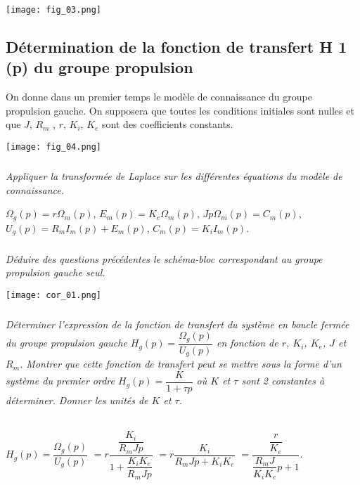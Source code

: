 \begin{multicols}{2}
\begin{center}
\texttt{[image: fig\_03.png]}
\end{center}
\fi


\subsection*{Détermination de la fonction de transfert H 1 (p) du groupe propulsion}
\ifprof
\else
On donne dans un premier temps le modèle de connaissance du groupe propulsion gauche. On supposera que toutes les conditions initiales sont nulles et que  $J$,  $R_m$ , $r$, $K_i$, $K_e$ sont des coefficients constants.

\begin{center}
\texttt{[image: fig\_04.png]}
\end{center}
\fi

\subparagraph{}
\textit{Appliquer la transformée de Laplace sur les différentes équations du modèle de connaissance.}
\ifprof
\begin{corrige}
$\Omega_g(p)=r\Omega_m(p)$, 
$E_m(p)=K_e\Omega_m(p)$, 
$Jp\Omega_m(p)=C_m(p)$,
$U_g(p)=R_m I_m(p) + E_m(p)$,
$C_m(p)=K_i I_m(p)$. 
\end{corrige}
\else
\fi


\subparagraph{}
\textit{Déduire des questions précédentes le schéma-bloc correspondant au groupe propulsion gauche seul. }
\ifprof
\begin{corrige}
\begin{center}
\texttt{[image: cor\_01.png]}
\end{center}
\end{corrige}
\else
\fi

\subparagraph{}
\textit{Déterminer l’expression de la fonction de transfert du système en boucle fermée du groupe propulsion gauche 
$H_g (p) =\dfrac{\Omega_g(p)}{U_g(p)}$ en fonction de $r$, $K_i$, $K_e$, $J$ et $R_m$. Montrer que cette fonction de
transfert peut se mettre sous la forme d’un système du premier ordre $H_g(p)=\dfrac{K}{1+\tau p}$  où $K$ et $\tau$ 
sont 2 constantes à déterminer. Donner les unités de $K$ et $\tau$. } 

\ifprof
\begin{corrige} ~\\

$H_g (p) =\dfrac{\Omega_g(p)}{U_g(p)}$
$= r \dfrac{\dfrac{K_i}{R_mJp}}{1+\dfrac{K_iK_e}{R_mJp}}$
$= r \dfrac{K_i}{R_mJp+{K_iK_e}}$
$=  \dfrac{\dfrac{r}{K_e}}{\dfrac{R_mJ}{K_iK_e}p+1}$.


\end{corrige}
\end{multicols}
